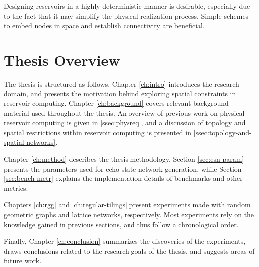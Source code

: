 Designing reservoirs in a highly deterministic manner is desirable, especially
due to the fact that it may simplify the physical realization process. Simple
schemes to embed nodes in space and establish connectivity are beneficial.

\section{Thesis Overview}

The thesis is structured as follows. Chapter \ref{ch:intro} introduces the
research domain, and presents the motivation behind exploring spatial
constraints in reservoir computing. Chapter \ref{ch:background} covers relevant
background material used throughout the thesis. An overview of previous work on
physical reservoir computing is given in \ref{ssec:physreq}, and a discussion of
topology and spatial restrictions within reservoir computing is presented in
\ref{ssec:topology-and-spatial-networks}.

Chapter \ref{ch:method} describes the thesis methodology. Section
\ref{sec:esn-param} presents the parameters used for echo state network
generation, while Section \ref{sec:bench-metr} explains the implementation
details of benchmarks and other metrics.

Chapters \ref{ch:rgg} and \ref{ch:regular-tilings} present experiments made with
random geometric graphs and lattice networks, respectively. Most experiments
rely on the knowledge gained in previous sections, and thus follow a
chronological order.

Finally, Chapter \ref{ch:conclusion} summarizes the discoveries of the
experiments, draws conclusions related to the research goals of the thesis, and
suggests areas of future work.

